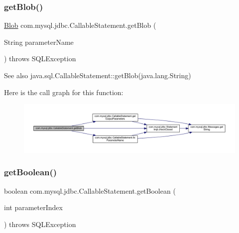 \subsubsection{\texorpdfstring{get\+Blob()}{getBlob()}\hspace{0.1cm}{\footnotesize\ttfamily [2/2]}}
{\footnotesize\ttfamily \mbox{\hyperlink{classcom_1_1mysql_1_1jdbc_1_1_blob}{Blob}} com.\+mysql.\+jdbc.\+Callable\+Statement.\+get\+Blob (\begin{DoxyParamCaption}\item[{String}]{parameter\+Name }\end{DoxyParamCaption}) throws S\+Q\+L\+Exception}

\begin{DoxySeeAlso}{See also}
java.\+sql.\+Callable\+Statement\+::get\+Blob(java.\+lang.\+String) 
\end{DoxySeeAlso}
Here is the call graph for this function\+:\nopagebreak
\begin{figure}[H]
\begin{center}
\leavevmode
\includegraphics[width=350pt]{classcom_1_1mysql_1_1jdbc_1_1_callable_statement_a6749653815df64cc270f1148ba0ca2bc_cgraph}
\end{center}
\end{figure}
\mbox{\label{classcom_1_1mysql_1_1jdbc_1_1_callable_statement_ad482ae86ec044429a8b799f314138414}} 
\subsubsection{\texorpdfstring{get\+Boolean()}{getBoolean()}\hspace{0.1cm}{\footnotesize\ttfamily [1/2]}}
{\footnotesize\ttfamily boolean com.\+mysql.\+jdbc.\+Callable\+Statement.\+get\+Boolean (\begin{DoxyParamCaption}\item[{int}]{parameter\+Index }\end{DoxyParamCaption}) throws S\+Q\+L\+Exception}

